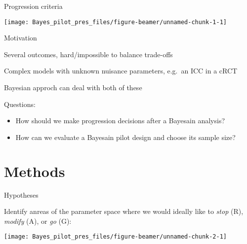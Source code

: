 \documentclass[
  ignorenonframetext,
]{beamer}
\providecommand{\tightlist}{%
  \setlength{\itemsep}{0pt}\setlength{\parskip}{0pt}}
\begin{document}
\begin{frame}{Progression criteria}
\protect\hypertarget{progression-criteria}{}

\texttt{[image: Bayes\_pilot\_pres\_files/figure-beamer/unnamed-chunk-1-1]}

\end{frame}

\begin{frame}{Motivation}
\protect\hypertarget{motivation}{}

Several outcomes, hard/impossible to balance trade-offs

Complex models with unknown nuisance parameters, e.g.~an ICC in a cRCT

Bayesian approch can deal with both of these

Questions:

\begin{itemize}
\tightlist
\item
  How should we make progression decisions after a Bayesain analysis?
\item
  How can we evaluate a Bayesain pilot design and choose its sample
  size?
\end{itemize}

\end{frame}

\hypertarget{methods}{%
\section{Methods}\label{methods}}

\begin{frame}{Hypotheses}
\protect\hypertarget{hypotheses}{}

Identify anreas of the parameter space where we would ideally like to
\emph{stop} (R), \emph{modify} (A), or \emph{go} (G):

\texttt{[image: Bayes\_pilot\_pres\_files/figure-beamer/unnamed-chunk-2-1]}

\end{frame}
\end{document}
